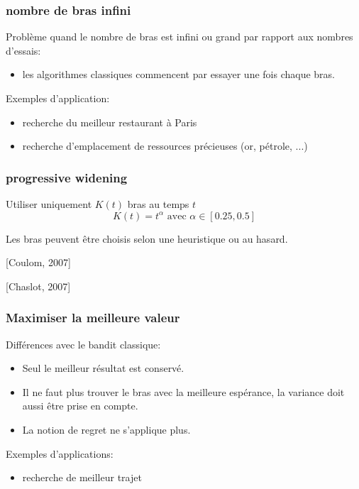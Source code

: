 \documentclass{beamer}
\begin{document}
\begin{frame}
    \frametitle{nombre de bras infini}
    Problème quand le nombre de bras est infini ou grand par rapport aux nombres d'essais:

    \begin{itemize}
        \item les algorithmes classiques commencent par essayer une fois chaque bras.
    \end{itemize}

    Exemples d'application:
    \begin{itemize}
        \item recherche du meilleur restaurant à Paris 
        \item recherche d'emplacement de ressources précieuses (or, pétrole, ...)
    \end{itemize}

\end{frame}

\begin{frame}
    \frametitle{progressive widening}

    Utiliser uniquement $K(t)$ bras au temps $t$
    $$ K(t) = t^\alpha \mbox{ avec } \alpha \in [0.25,0.5]$$

    Les bras peuvent être choisis selon une heuristique ou au hasard.

    \hfill [Coulom, 2007]

    \hfill [Chaslot, 2007]

\end{frame}

\begin{frame}
    \frametitle{Maximiser la meilleure valeur}

    Différences avec le bandit classique:
    \begin{itemize}
        \item Seul le meilleur résultat est conservé.
        \item Il ne faut plus trouver le bras avec la meilleure espérance, la variance doit aussi être prise en compte.
        \item La notion de regret ne s'applique plus.
    \end{itemize}

    Exemples d'applications: 
    \begin{itemize}
        \item recherche de meilleur trajet
    \end{itemize}

\end{frame}
\end{document}

